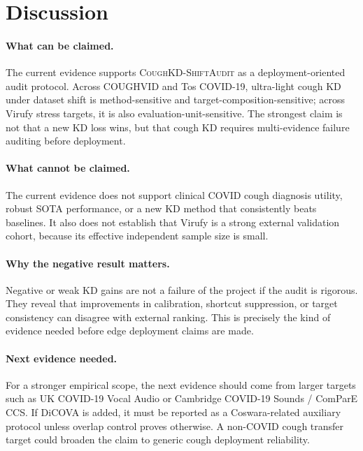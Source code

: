 \section{Discussion}

\paragraph{What can be claimed.}
The current evidence supports \textsc{CoughKD-ShiftAudit} as a deployment-oriented audit protocol. Across COUGHVID and Tos COVID-19, ultra-light cough KD under dataset shift is method-sensitive and target-composition-sensitive; across Virufy stress targets, it is also evaluation-unit-sensitive. The strongest claim is not that a new KD loss wins, but that cough KD requires multi-evidence failure auditing before deployment.

\paragraph{What cannot be claimed.}
The current evidence does not support clinical COVID cough diagnosis utility, robust SOTA performance, or a new KD method that consistently beats baselines. It also does not establish that Virufy is a strong external validation cohort, because its effective independent sample size is small.

\paragraph{Why the negative result matters.}
Negative or weak KD gains are not a failure of the project if the audit is rigorous. They reveal that improvements in calibration, shortcut suppression, or target consistency can disagree with external ranking. This is precisely the kind of evidence needed before edge deployment claims are made.

\paragraph{Next evidence needed.}
For a stronger empirical scope, the next evidence should come from larger targets such as UK COVID-19 Vocal Audio or Cambridge COVID-19 Sounds / ComParE CCS. If DiCOVA is added, it must be reported as a Coswara-related auxiliary protocol unless overlap control proves otherwise. A non-COVID cough transfer target could broaden the claim to generic cough deployment reliability.
